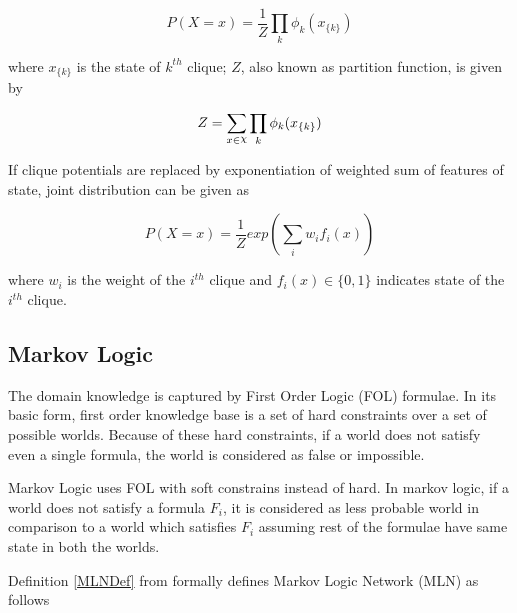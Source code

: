 \begin{equation}
	\label{jointDist}
	P(X = x) = \frac{1}{Z}{\displaystyle \prod_{k} \phi_{k}(x_{\{k\}})}
\end{equation}

where $x_{\{k\}}$ is the state of $k^{th}$ clique;
$Z$, also known as partition function, is given by

\begin{equation}
	\label{partitionFunc}
	Z = \displaystyle \sum_{x \in \rchi} \displaystyle \prod_{k} \phi_k(x_{\{k\}}) 
\end{equation}

If clique potentials are replaced by exponentiation of weighted sum of features of state,
joint distribution can be given as

\begin{equation}
	\label{jointDistWeighted}
	P(X = x) = \frac{1}{Z} exp \left( \displaystyle \sum_i w_i f_i(x) \right)
\end{equation}

where $w_i$ is the weight of the $i^{th}$ clique and $f_i(x) \in \{0,1\}$ indicates state 
of the $i^{th}$ clique.

\subsection{Markov Logic}
The domain knowledge is captured by First Order Logic (FOL) formulae. In its basic form, 
first order knowledge base is a set of hard constraints over a set of possible worlds.
Because of these hard constraints, if a world does not satisfy even a single formula,
the world is considered as false or impossible.

Markov Logic uses FOL with soft constrains instead of hard. In markov logic, if a world
does not satisfy a formula $F_i$, it is considered as less probable world in comparison to a
world which satisfies $F_i$ assuming rest of the formulae have same state in both the worlds.

Definition \ref{MLNDef} from \cite{MarkovLogic} formally defines 
Markov Logic Network (MLN) as follows

